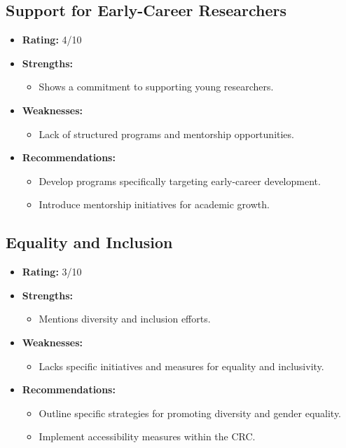 \documentclass{article}
\begin{document}
\subsection{Support for Early-Career Researchers}
\begin{itemize}
    \item \textbf{Rating:} 4/10
    \item \textbf{Strengths:}
        \begin{itemize}
            \item Shows a commitment to supporting young researchers.
        \end{itemize}
    \item \textbf{Weaknesses:}
        \begin{itemize}
            \item Lack of structured programs and mentorship opportunities.
        \end{itemize}
    \item \textbf{Recommendations:}
        \begin{itemize}
            \item Develop programs specifically targeting early-career development.
            \item Introduce mentorship initiatives for academic growth.
        \end{itemize}
\end{itemize}

\subsection{Equality and Inclusion}
\begin{itemize}
    \item \textbf{Rating:} 3/10
    \item \textbf{Strengths:}
        \begin{itemize}
            \item Mentions diversity and inclusion efforts.
        \end{itemize}
    \item \textbf{Weaknesses:}
        \begin{itemize}
            \item Lacks specific initiatives and measures for equality and inclusivity.
        \end{itemize}
    \item \textbf{Recommendations:}
        \begin{itemize}
            \item Outline specific strategies for promoting diversity and gender equality.
            \item Implement accessibility measures within the CRC.
        \end{itemize}
\end{itemize}
\end{document}

